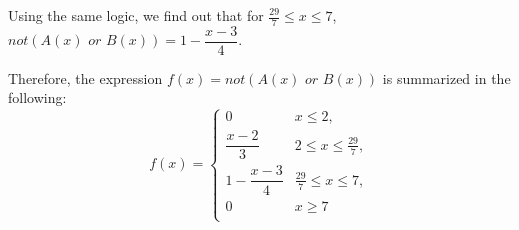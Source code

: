 Using the same logic, we find out that for $\frac{29}{7} \le x \le 7$, $\textit{not}\left(A(x) \textit{ or } B(x)\right) = 1 - \dfrac{x-3}{4}$. 

Therefore, the expression $f(x) = \textit{not}\left(A(x) \textit{ or } B(x)\right)$ is summarized in the following:
\begin{equation}
	f(x) = \left\{
	\begin{array}{cc}
		0 & x \le 2, \\[4mm]
		\dfrac{x-2}{3} & 2 \le x \le \frac{29}{7}, \\[4mm]
		1 - \dfrac{x-3}{4} & \frac{29}{7} \le x \le 7, \\[4mm]
		0 & x \ge 7\\
	\end{array}
	\right.
\end{equation}